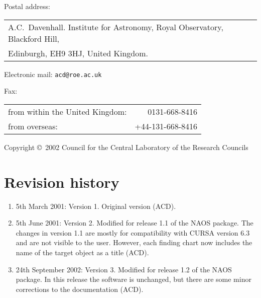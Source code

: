 \documentclass[twoside,11pt]{article}
\newcommand{\stardocinitials}  {SUN}
\newcommand{\stardoccopyright} 
{Copyright \copyright\ 2002 Council for the Central Laboratory of the Research Councils}
\newcommand{\stardocnumber}    {235.3}
\newcommand{\stardocname}{\stardocinitials /\stardocnumber}
\newenvironment{latexonly}{}{}
\renewcommand{\_}{\texttt{\symbol{95}}}
\begin{document}
Postal address: \\
\begin{tabular}{l}
A.C.~Davenhall.  Institute for Astronomy, Royal Observatory, Blackford
Hill, \\
Edinburgh, EH9 3HJ, United Kingdom.  \\
\end{tabular}


Electronic mail: {\tt acd@roe.ac.uk}

Fax: \\
\begin{tabular}{lr}
from within the United Kingdom: &    0131-668-8416 \\
from overseas:                  & +44-131-668-8416 \\
\end{tabular}

\vspace*{\fill}
\stardoccopyright

\newpage
\section*{Revision history}

\begin{enumerate}

  \item 5th March 2001: Version 1. Original version (ACD).

  \item 5th June 2001: Version 2. Modified for release 1.1 of the NAOS
   package.  The changes in version 1.1 are mostly for compatibility
   with CURSA version 6.3 and are not visible to the user.  However,
   each finding chart now includes the name of the target object as a
   title (ACD).

  \item 24th September 2002: Version 3. Modified for release 1.2 of the
   NAOS package.  In this release the software is unchanged, but there are
   some minor corrections to the documentation (ACD).

\end{enumerate}

\cleardoublepage
\begin{latexonly}
  \setlength{\parskip}{0mm}
  \tableofcontents

  \newpage
  \listoffigures
  \listoftables

  \setlength{\parskip}{\medskipamount}
  \markboth{\stardocname}{\stardocname}
\end{latexonly}
\end{document}
